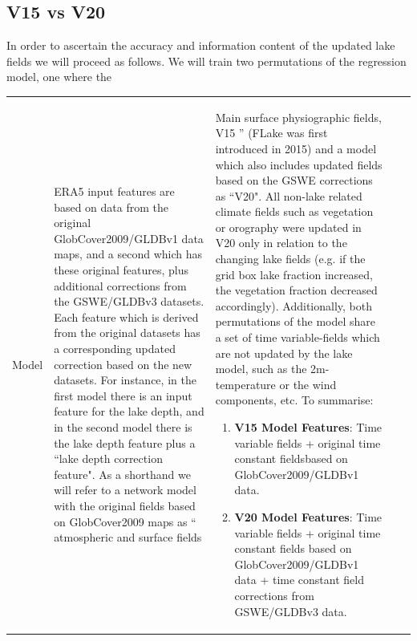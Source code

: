 \documentclass[hess, twostagejnl]{copernicus}
\providecommand{\DIFadd}[1]{{\protect\color{blue} \sf #1}} %
\providecommand{\DIFdel}[1]{{\protect\color{red} \scriptsize #1}} %
\providecommand{\DIFaddbegin}{} %
\providecommand{\DIFdelend}{} %
\providecommand{\DIFaddFL}[1]{\DIFadd{#1}} %
\providecommand{\DIFdelFL}[1]{\DIFdel{#1}} %
\providecommand{\DIFaddbeginFL}{} %
\providecommand{\DIFaddendFL}{} %
\providecommand{\DIFdelbeginFL}{} %
\providecommand{\DIFdelendFL}{} %
\begin{document}
\subsection{\DIFdel{V15 vs V20}}
\addtocounter{subsection}{-1}%
\DIFdel{In order to ascertain the accuracy and information content of the updated lake fields we will proceed as follows. We will train two permutations of the regression model, one where the }\DIFdelend \DIFaddbegin \begin{table}
 	\begin{tabularx}{\textwidth}{lXXXX}
 		\toprule
 		\DIFaddFL{Model }& \DIFaddendFL ERA5 \DIFdelbeginFL \DIFdelFL{input features are based on data from the original GlobCover2009/GLDBv1 data maps, and a second which has these original features, plus additional corrections from the GSWE/GLDBv3 datasets. Each feature which is derived from the original datasets has a corresponding updated correction based on the new datasets. For instance, in the first model there is an input feature for the lake depth, and in the second model there is the lake depth feature plus a ``lake depth correction feature". As a shorthand we will refer to a network model with the original fields based on GlobCover2009 maps as ``}\DIFdelendFL \DIFaddbeginFL \DIFaddFL{atmospheric and surface fields }&  \DIFaddFL{Main surface physiographic fields, }\DIFaddendFL V15 \DIFdelbeginFL \DIFdelFL{'' (FLake was first introduced in 2015) and a model which also includes updated fields based on the GSWE corrections as ``V20". All non-lake related climate fields such as vegetation or orography were updated in V20 only in relation to the changing lake fields (e.g. if the grid box lake fraction increased, the vegetation fraction decreased accordingly). Additionally, both permutations of the model share a set of time variable-fields which are not updated by the lake model, such as the 2m-temperature or the wind components, etc. To summarise:
}%
\begin{enumerate}%
\item%
\DIFdelFL{\textbf{V15 Model Features}: Time variable fields + original time constant fieldsbased on GlobCover2009/GLDBv1 data.
	}%
\item%
\DIFdelFL{\textbf{V20 Model Features}: Time variable fields + original time constant fields based on GlobCover2009/GLDBv1 data + time constant field corrections from GSWE/GLDBv3 data.
}
\end{enumerate}
\end{tabularx}
\end{table}
\end{document}
